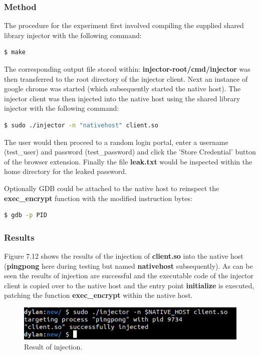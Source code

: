 \subsubsection{Method}

The procedure for the experiment first involved compiling the supplied shared library injector \cite{injector} with the following command:
\begin{lstlisting}[language=bash, frame=none]
$ make
\end{lstlisting}

The corresponding output file stored within: \textbf{injector-root/cmd/injector} was then transferred to the root directory of the injector client. Next an instance of google chrome was started (which subsequently started the native host). The injector client was then injected into the native host using the shared library injector with the following command:

\begin{lstlisting}[language=bash, frame=none]
$ sudo ./injector -n "nativehost" client.so
\end{lstlisting}

The user would then proceed to a random login portal, enter a username (test\_user) and password (test\_password) and click the 'Store Credential' button of the browser extension. Finally the file \textbf{leak.txt} would be inspected within the home directory for the leaked password.

Optionally GDB could be attached to the native host to reinspect the \textbf{exec\_encrypt} function with the modified instruction bytes:

\begin{lstlisting}[language=bash, frame=none]
$ gdb -p PID
\end{lstlisting}

\subsubsection{Results}

Figure 7.12 shows the results of the injection of \textbf{client.so} into the native host (\textbf{pingpong} here during testing but named \textbf{nativehost} subsequently). As can be seen the results of injection are successful and the executable code of the injector client is copied over to the native host and the entry point \textbf{initialize} is executed, patching the function \textbf{exec\_encrypt} within the native host.
\begin{figure}[H]
\centering
\includegraphics[width=0.8\columnwidth]{Figures/Fig_39.png}
\caption{Result of injection.}
\label{fig:gantt}
\end{figure}

